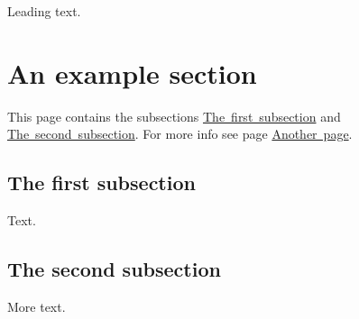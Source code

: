 Leading text. \hypertarget{page1_sec}{}\section{An example section}\label{page1_sec}
This page contains the subsections \mbox{\hyperlink{page1_subsection1}{The first subsection}} and \mbox{\hyperlink{page1_subsection2}{The second subsection}}. For more info see page \mbox{\hyperlink{page2}{Another page}}. \hypertarget{page1_subsection1}{}\subsection{The first subsection}\label{page1_subsection1}
Text. \hypertarget{page1_subsection2}{}\subsection{The second subsection}\label{page1_subsection2}
More text. 